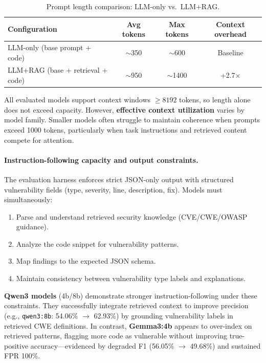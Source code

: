 \begin{table}[H]
  \centering
  \caption{Prompt length comparison: LLM-only vs.\ LLM+RAG.}
  \label{tab:rag-prompt-stats}
  \small
  \begin{tabular}{lccc}
    \toprule
    Configuration & Avg tokens & Max tokens & Context overhead \\
    \midrule
    LLM-only (base prompt + code) & $\sim$350 & $\sim$600 & Baseline \\
    LLM+RAG (base + retrieval + code) & $\sim$950 & $\sim$1400 & +2.7$\times$ \\
    \bottomrule
  \end{tabular}
\end{table}

All evaluated models support context windows $\geq 8192$ tokens, so length alone does not exceed capacity. However, \textbf{effective context utilization} varies by model family. Smaller models often struggle to maintain coherence when prompts exceed 1000 tokens, particularly when task instructions and retrieved content compete for attention.

\paragraph{Instruction-following capacity and output constraints.}
The evaluation harness enforces strict JSON-only output with structured vulnerability fields (type, severity, line, description, fix). Models must simultaneously:
\begin{enumerate}
  \item Parse and understand retrieved security knowledge (CVE/CWE/OWASP guidance).
  \item Analyze the code snippet for vulnerability patterns.
  \item Map findings to the expected JSON schema.
  \item Maintain consistency between vulnerability type labels and explanations.
\end{enumerate}

\textbf{Qwen3 models} (4b/8b) demonstrate stronger instruction-following under these constraints. They successfully integrate retrieved context to improve precision (e.g., \texttt{qwen3:8b}: 54.06\% $\rightarrow$ 62.93\%) by grounding vulnerability labels in retrieved CWE definitions. In contrast, \textbf{Gemma3:4b} appears to over-index on retrieved patterns, flagging more code as vulnerable without improving true-positive accuracy—evidenced by degraded F1 (56.05\% $\rightarrow$ 49.68\%) and sustained FPR 100\%.

